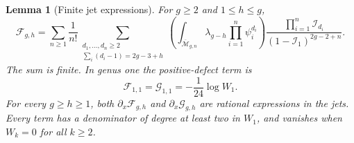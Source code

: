 \documentclass[a4paper,10pt]{article}
\numberwithin{equation}{section}
\newcommand{\MM}{\overline{\mathcal{M}}}
\theoremstyle{paperplain}
\newtheorem{lmm}[thm]{Lemma}
\theoremstyle{paperremark}
\theoremstyle{paperplain}
\begin{document}
\begin{lmm}[Finite jet expressions]\label{lmm:s07:finite-jets}
For $g\geq2$ and $1\leq h\leq g$,
\begin{equation}\label{eq:s07:finite-jets}
 \mathcal F_{g,h}
 =\sum_{n\geq1}\frac1{n!}
   \sum_{\substack{d_1,\ldots,d_n\geq2\\
                   \sum_i(d_i-1)=2g-3+h}}
   \left(\int_{\MM_{g,n}}\lambda_{g-h}
                                  \prod_{i=1}^n\psi_i^{d_i}\right)
   \frac{\prod_{i=1}^n\mathcal I_{d_i}}
        {(1-\mathcal I_1)^{2g-2+n}}.
\end{equation}
The sum is finite. In genus one the positive-defect term is
\begin{equation}\label{eq:s07:genus-one-seed}
 \mathcal F_{1,1}=\mathcal G_{1,1}
                         =-\frac1{24}\log W_1.
\end{equation}
For every $g\geq h\geq1$, both
$\partial_x\mathcal F_{g,h}$ and
$\partial_x\mathcal G_{g,h}$ are rational expressions in the jets.
Every term has a denominator of degree at least two in $W_1$, and
vanishes when $W_k=0$ for all $k\geq2$.
\end{lmm}
\end{document}
